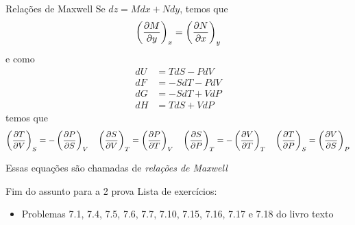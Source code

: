 \documentclass[t,%
brazilian,%
11pt,%
aspectratio=169,%
table%
]{beamer}
\newcommand{\esima}{\textordfeminine }
\begin{document}
 \begin{frame}{Relações de Maxwell}
     Se \(dz = M dx + N dy\), temos que
     \[
         \left(\frac{\partial M}{\partial y}\right)_x = \left(\frac{\partial N}{\partial x}\right)_y
     \]
     e como
     \begin{align*}
         dU &= TdS - PdV \\
         dF &=  -SdT - PdV \\
         dG &=  -SdT + VdP \\
         dH &= TdS + VdP
     \end{align*}
     temos que
     \[
         \left(\frac{\partial T}{\partial V}\right)_S = - \left(\frac{\partial P}{\partial S}\right)_V \quad
         \left(\frac{\partial S}{\partial V}\right)_T = \left(\frac{\partial P}{\partial T}\right)_V \quad
         \left(\frac{\partial S}{\partial P}\right)_T = -\left(\frac{\partial V}{\partial T}\right)_T \quad
         \left(\frac{\partial T}{\partial P}\right)_S = \left(\frac{\partial V}{\partial S}\right)_P
     \]

     Essas equações são chamadas de \textit{relações de Maxwell}


 \end{frame}


 \begin{frame}{Fim do assunto para a 2\esima{} prova}
     Lista de exercícios: 
     \begin{itemize}
         \item Problemas 7.1, 7.4, 7.5, 7.6, 7.7, 7.10, 7.15, 7.16, 7.17 e 7.18 do livro texto
     \end{itemize}
 \end{frame}

\end{document}
